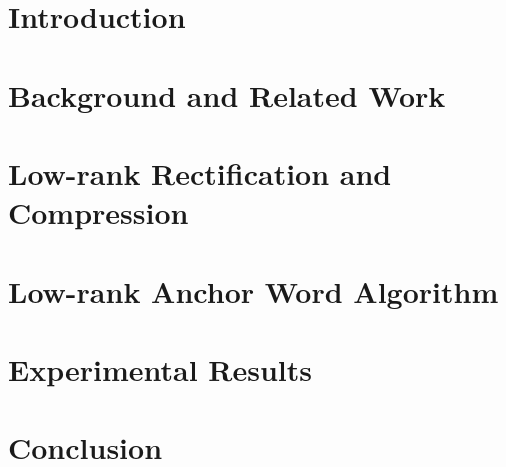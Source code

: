 



\section{Introduction}\label{lrtmsec:int}
	

\section{Background and Related Work}\label{lrtmsec:bac}
	

\section{Low-rank Rectification and Compression}\label{lrtmsec:lrr}
  

 \section{Low-rank Anchor Word Algorithm}\label{lrtmsec:law}
  

\section{Experimental Results}\label{lrtmsec:exp}
  

\section{Conclusion}\label{lrtmsec:con}
